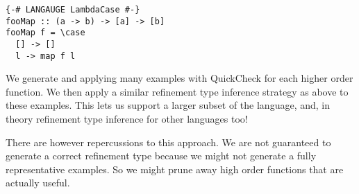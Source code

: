 \begin{verbatim}
{-# LANGAUGE LambdaCase #-}
fooMap :: (a -> b) -> [a] -> [b]
fooMap f = \case
  [] -> []
  l -> map f l
 \end{verbatim}

We generate and applying many examples with QuickCheck for each higher order function.
We then apply a similar refinement type inference strategy as above to these examples.
This lets us support a larger subset of the language, and, in theory refinement type inference for other languages too!

There are however repercussions to this approach. We are not guaranteed to generate a correct refinement type because we might not generate a fully representative examples. So we might prune away high order functions that are actually useful. 
